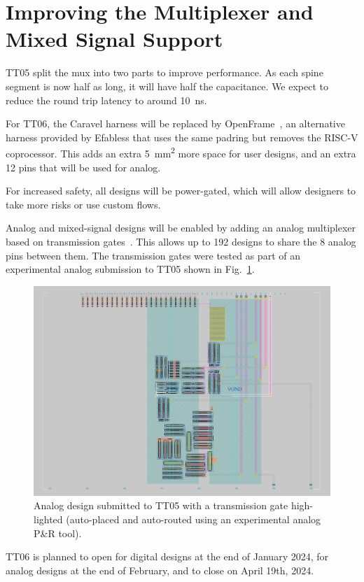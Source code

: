 \section{Improving the Multiplexer and Mixed Signal Support}
\label{sec:improving}

TT05 split the mux into two parts to improve performance.
As each spine segment is now half as long, it will have half the capacitance.
We expect to reduce the round trip latency to around \qty{10}{\ns}.

For TT06, the Caravel harness will be replaced by OpenFrame~\cite{openframe}, an alternative harness provided by Efabless that uses the same padring but removes the RISC-V coprocessor.
This adds an extra \qty{5}{\mm\squared} more space for user designs, and an extra 12 pins that will be used for analog.

For increased safety, all designs will be power-gated, which will allow designers to take more risks or use custom flows.

Analog and mixed-signal designs will be enabled by adding an analog multiplexer based on transmission gates~\cite{transmissiongates}. 
This allows up to 192 designs to share the 8 analog pins between them.
The transmission gates were tested as part of an experimental analog submission to TT05 shown in Fig.~\ref{fig:transmission_gate_TT05}.

\begin{figure}[!t]
\centering
\includegraphics[width=\columnwidth]{./Figs/tt05_transmission_gate.png}
\caption{Analog design submitted to TT05 with a transmission gate high-lighted (auto-placed and auto-routed using an experimental analog P\&R tool).}
\label{fig:transmission_gate_TT05}
\end{figure}

TT06 is planned to open for digital designs at the end of January 2024, for analog designs at the end of February, and to close on April 19th, 2024.
